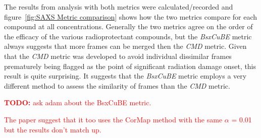 The results from analysis with both metrics were calculated/recorded and figure~\ref{fig:SAXS Metric comparison} shows how the two metrics compare for each compound at all concentrations.
Generally the two metrics agree on the order of the efficacy of the various radioprotectant compounds, but the \textit{BsxCuBE} metric always suggests that more frames can be merged then the \textit{CMD} metric.
Given that the \textit{CMD} metric was developed to avoid individual dissimilar frames prematurely being flagged as the point of significant radiation damage onset, this result is quite surprising.
It suggests that the \textit{BsxCuBE} metric employs a very different method to assess the similarity of frames than the \textit{CMD} metric.
\textcolor{red}{
    \begin{myenumerate}
        \item \hypertarget{todo:Ask Adam about BsxCuBE}{\textbf{TODO:} ask adam about the BsxCuBE metric.}
        The paper suggest that it too uses the CorMap method with the same $\alpha$ = 0.01 but the results don't match up.
    \end{myenumerate}
}
